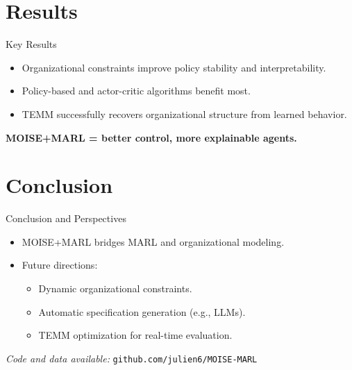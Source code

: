 \documentclass[9pt, aspectratio=169]{beamer}
\begin{document}
\section{Results}

\begin{frame}{Key Results}
  \begin{itemize}
    \item Organizational constraints improve policy stability and interpretability.
    \item Policy-based and actor-critic algorithms benefit most.
    \item TEMM successfully recovers organizational structure from learned behavior.
  \end{itemize}
  \vspace{1em}
  \textbf{MOISE+MARL = better control, more explainable agents.}
\end{frame}

\section{Conclusion}


\begin{frame}{Conclusion and Perspectives}
  \begin{itemize}
    \item MOISE+MARL bridges MARL and organizational modeling.
    \item Future directions:
          \begin{itemize}
            \item Dynamic organizational constraints.
            \item Automatic specification generation (e.g., LLMs).
            \item TEMM optimization for real-time evaluation.
          \end{itemize}
  \end{itemize}
  \vspace{0.5em}
  \centering
  \textit{Code and data available:} \texttt{github.com/julien6/MOISE-MARL}
\end{frame}


\appendix





\end{document}
